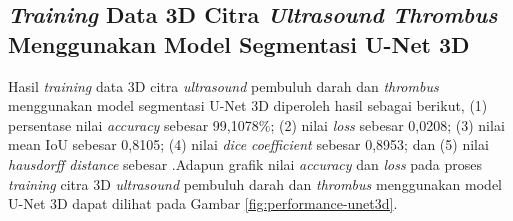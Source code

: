 \subsection{\textit{Training} Data 3D Citra \textit{Ultrasound Thrombus} Menggunakan Model Segmentasi U-Net 3D}





Hasil \textit{training} data 3D citra \textit{ultrasound} pembuluh darah dan \textit{thrombus} menggunakan model segmentasi U-Net 3D diperoleh hasil sebagai berikut, (1) persentase nilai \textit{accuracy} sebesar 99,1078\%; (2) nilai \textit{loss} sebesar 0,0208; (3) nilai mean IoU sebesar 0,8105; (4) nilai \textit{dice coefficient} sebesar 0,8953; dan (5) nilai \textit{hausdorff distance} sebesar .Adapun grafik nilai \textit{accuracy} dan \textit{loss} pada proses \textit{training} citra 3D \textit{ultrasound} pembuluh darah dan \textit{thrombus} menggunakan model U-Net 3D dapat dilihat pada Gambar \ref{fig:performance-unet3d}.

